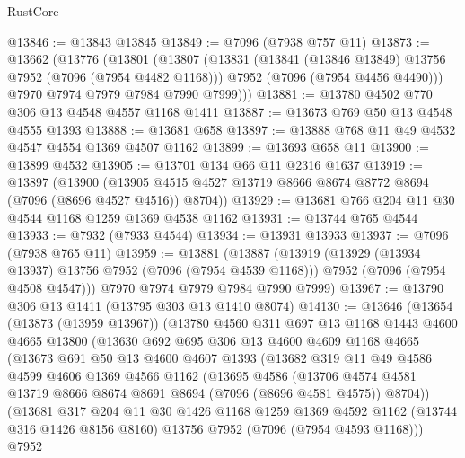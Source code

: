 \begin{lexlean}{RustCore}
\begin{coremodule}
@13846 := @13843 @13845
@13849 := @7096 (@7938 @757 @11)
@13873 := @13662
    (@13776
      (@13801
        (@13807
          (@13831
            (@13841 (@13846 @13849) @13756 @7952 (@7096 (@7954 @4482 @1168)))
            @7952
            (@7096 (@7954 @4456 @4490)))
          @7970
          @7974
          @7979
          @7984
          @7990
          @7999)))
@13881 := @13780 @4502 @770 @306 @13 @4548 @4557 @1168 @1411
@13887 := @13673 @769 @50 @13 @4548 @4555 @1393
@13888 := @13681 @658
@13897 := @13888 @768 @11 @49 @4532 @4547 @4554 @1369 @4507 @1162
@13899 := @13693 @658 @11
@13900 := @13899 @4532
@13905 := @13701 @134 @66 @11 @2316 @1637
@13919 := @13897
    (@13900 (@13905 @4515 @4527 @13719 @8666 @8674 @8772 @8694 (@7096 (@8696 @4527 @4516)) @8704))
@13929 := @13681 @766 @204 @11 @30 @4544 @1168 @1259 @1369 @4538 @1162
@13931 := @13744 @765 @4544
@13933 := @7932 (@7933 @4544)
@13934 := @13931 @13933
@13937 := @7096 (@7938 @765 @11)
@13959 := @13881
    (@13887
      (@13919
        (@13929 (@13934 @13937) @13756 @7952 (@7096 (@7954 @4539 @1168)))
        @7952
        (@7096 (@7954 @4508 @4547)))
      @7970
      @7974
      @7979
      @7984
      @7990
      @7999)
@13967 := @13790 @306 @13 @1411 (@13795 @303 @13 @1410 @8074)
@14130 := @13646
    (@13654
      (@13873 (@13959 @13967))
      (@13780
        @4560
        @311
        @697
        @13
        @1168
        @1443
        @4600
        @4665
        @13800
        (@13630
          @692
          @695
          @306
          @13
          @4600
          @4609
          @1168
          @4665
          (@13673
            @691
            @50
            @13
            @4600
            @4607
            @1393
            (@13682
              @319
              @11
              @49
              @4586
              @4599
              @4606
              @1369
              @4566
              @1162
              (@13695
                @4586
                (@13706
                  @4574
                  @4581
                  @13719
                  @8666
                  @8674
                  @8691
                  @8694
                  (@7096 (@8696 @4581 @4575))
                  @8704))
              (@13681
                @317
                @204
                @11
                @30
                @1426
                @1168
                @1259
                @1369
                @4592
                @1162
                (@13744 @316 @1426 @8156 @8160)
                @13756
                @7952
                (@7096 (@7954 @4593 @1168)))
              @7952

\end{coremodule}
\end{lexlean}
